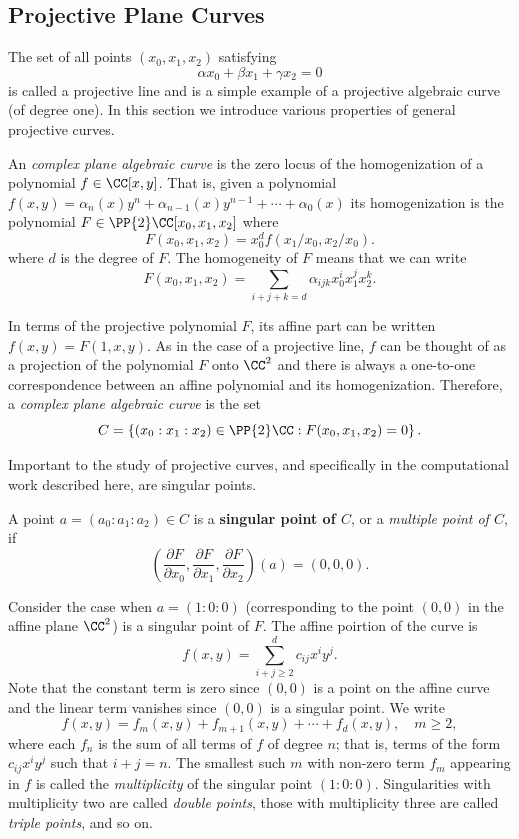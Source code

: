 \subsection{Projective Plane Curves} \label{sec: projective-plane-curves}

The set of all points $(x_0, x_1, x_2)$ satisfying
\[
    \alpha x_0 + \beta x_1 + \gamma x_2 = 0
\]
is called a projective line and is a simple example of a projective
algebraic curve (of degree one). In this section we introduce various
properties of general projective curves.

An {\it complex plane algebraic curve} is the zero locus of the
homogenization of a polynomial $f \in \CC[x,y]$. That is, given a
polynomial $f(x,y) = \alpha_n(x) y^n + \alpha_{n-1}(x)y^{n-1} + \cdots +
\alpha_0(x)$ its homogenization is the polynomial $F \in
\PP{2}\CC[x_0,x_1,x_2]$ where
\[
    F(x_0,x_1,x_2) = x_0^d f(x_1/x_0,x_2/x_0).
\]
where $d$ is the degree of $F$. The homogeneity of $F$ means that we can
write
\[
    F(x_0,x_1,x_2) = \sum_{i+j+k=d} \alpha_{ijk} x_0^i x_1^j x_2^k.
\]

In terms of the projective polynomial $F$, its affine part can be
written $f(x,y) = F(1,x,y)$. As in the case of a projective line, $f$
can be thought of as a projection of the polynomial $F$ onto $\CC^2$ and
there is always a one-to-one correspondence between an affine polynomial
and its homogenization. Therefore, a {\it complex plane algebraic curve}
is the set
\[
  C = \left\{
  (x_0 : x_1 : x_2) \in \PP{2}\CC : F(x_0,x_1,x_2) = 0
  \right\}.
\]

Important to the study of projective curves, and specifically in the
computational work described here, are singular points.
\begin{definition} \label{def: singular-point}
  A point $a = (a_0 : a_1 : a_2) \in C$ is a {\bf singular point of
    $C$}, or a {\it multiple point of $C$}, if
  \[
      \left(
        \frac{\partial F}{\partial x_0},
        \frac{\partial F}{\partial x_1},
        \frac{\partial F}{\partial x_2}
      \right) (a)
      = (0,0,0).
  \]
\end{definition}
Consider the case when $a = (1 : 0 : 0)$ (corresponding to the point
$(0,0)$ in the affine plane $\CC^2$) is a singular point of $F$. The
affine poirtion of the curve is
\[
f(x,y) = \sum_{i+j \geq 2}^d c_{ij} x^iy^j.
\]
Note that the constant term is zero since $(0, 0)$ is a point on the
affine curve and the linear term vanishes since $(0,0)$ is a singular
point. We write
\[
  f(x,y) = f_m(x,y) + f_{m+1}(x,y) + \cdots + f_d(x,y), \quad m \geq 2,
\]
where each $f_n$ is the sum of all terms of $f$ of degree $n$; that is,
terms of the form $c_{ij}x^iy^j$ such that $i+j=n$. The smallest such
$m$ with non-zero term $f_m$ appearing in $f$ is called the {\it
  multiplicity} of the singular point $(1 : 0 : 0)$. Singularities with
multiplicity two are called {\it double points}, those with multiplicity
three are called {\it triple points}, and so on.

